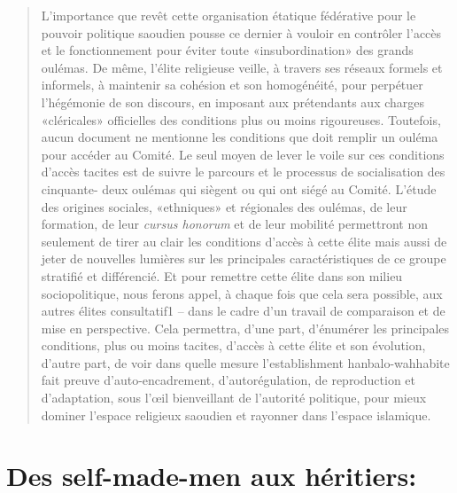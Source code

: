 \begin{quote}
L'importance que revêt cette
organisation étatique fédérative pour le pouvoir politique saoudien
pousse ce dernier à vouloir en contrôler l'accès et le fonctionnement
pour éviter toute «insubordination» des grands oulémas. De même, l'élite
religieuse veille, à travers ses réseaux formels et informels, à
maintenir sa cohésion et son homogénéité, pour perpétuer l'hégémonie de
son discours, en imposant aux prétendants aux charges «cléricales»
officielles des conditions plus ou moins rigoureuses. Toutefois, aucun
document ne mentionne les conditions que doit remplir un ouléma pour
accéder au Comité. Le seul moyen de lever le voile sur ces conditions
d'accès tacites est de suivre le parcours et le processus de
socialisation des cinquante- deux oulémas qui siègent ou qui ont siégé
au Comité. L'étude des origines sociales,
«ethniques» et régionales des oulémas, de leur formation, de leur
\emph{cursus honorum} et de leur mobilité permettront non seulement de
tirer au clair les conditions d'accès à cette élite mais aussi de jeter
de nouvelles lumières sur les principales caractéristiques de ce groupe
stratifié et différencié. Et pour remettre cette élite dans son milieu
sociopolitique, nous ferons appel, à chaque fois que cela sera possible,
aux autres élites
consultatif1 -- dans le cadre d'un travail de comparaison et de mise en
perspective. Cela permettra, d'une part, d'énumérer les principales
conditions, plus ou moins tacites, d'accès à cette élite et son
évolution, d'autre part, de voir dans quelle mesure l'establishment
hanbalo-wahhabite fait preuve d'auto-encadrement, d'autorégulation, de
reproduction et d'adaptation, sous l'œil bienveillant de l'autorité
politique, pour mieux dominer l'espace religieux saoudien et rayonner
dans l'espace islamique.
\end{quote}

\hypertarget{des-self-made-men-aux-huxe9ritiers}{%
\section{Des self-made-men aux
héritiers:}\label{des-self-made-men-aux-huxe9ritiers}}

